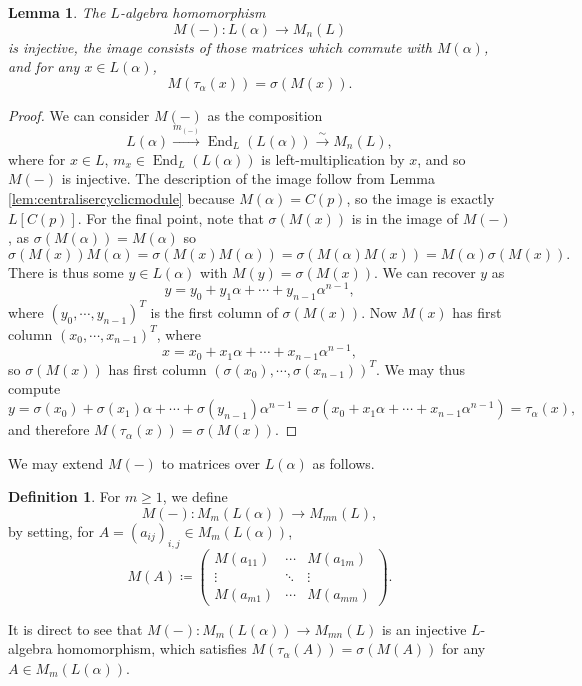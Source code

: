 \documentclass[10pt, reqno, hidelinks]{amsart}
\DeclareMathOperator{\End}{End}
\numberwithin{thm}{subsection}
\newtheorem{lemma}[thm]{Lemma}
\theoremstyle{definition}
\newtheorem{defn}[thm]{Definition}
\begin{document}
\begin{lemma}\label{lem:imageoffield1dim}
   The $L$-algebra homomorphism 
   \[
   M(-): L(\alpha) \rightarrow M_n(L)
   \]
   is injective, the image consists of those matrices which commute with $M(\alpha)$, and for any $x \in L(\alpha)$,
   \[
   M(\tau_{\alpha}(x)) = \sigma(M(x)).
   \]
\end{lemma}

\begin{proof}
   We can consider $M(-)$ as the composition
   \[
   L(\alpha) \xrightarrow{m_{(-)}} \End_L(L(\alpha)) \xrightarrow{\sim} M_n(L),
   \]
   where for $x \in L$, $m_x \in \End_L(L(\alpha))$ is left-multiplication by $x$, and so $M(-)$ is injective. The description of the image follow from Lemma \ref{lem:centralisercyclicmodule} because $M(\alpha) = C(p)$, so the image is exactly $L[C(p)]$. For the final point, note that $\sigma(M(x))$ is in the image of $M(-)$, as $\sigma(M(\alpha)) = M(\alpha)$ so
\[
\sigma(M(x)) M(\alpha) = \sigma(M(x)M(\alpha)) = \sigma(M(\alpha)M(x)) = M(\alpha) \sigma(M(x)).
\]
There is thus some $y \in L(\alpha)$ with $M(y) = \sigma(M(x))$. We can recover $y$ as
\[
y = y_0 + y_1 \alpha + \cdots + y_{n-1}\alpha^{n-1},
\]
where $(y_0, \cdots, y_{n-1})^T$ is the first column of $\sigma(M(x))$. Now $M(x)$ has first column $(x_0, \cdots, x_{n-1})^T$, where
\[
x = x_0 + x_1\alpha + \cdots + x_{n-1}\alpha^{n-1},
\]
so $\sigma(M(x))$ has first column $(\sigma(x_0), \cdots, \sigma(x_{n-1}))^T$. We may thus compute
\[
y = \sigma(x_0) + \sigma(x_1) \alpha + \cdots + \sigma(y_{n-1})\alpha^{n-1} = \sigma(x_0 + x_1\alpha + \cdots + x_{n-1}\alpha^{n-1}) = \tau_{\alpha}(x),
\]
and therefore $M(\tau_{\alpha}(x)) = \sigma(M(x))$.
\end{proof}

We may extend $M(-)$ to matrices over $L(\alpha)$ as follows.

\begin{defn}
   For $m \geq 1$, we define
   \[
   M(-) \colon M_m(L(\alpha)) \rightarrow M_{mn}(L),
   \]
   by setting, for $A = (a_{ij})_{i,j} \in M_m(L(\alpha))$,
   \[
       M(A) \coloneqq \begin{pmatrix}
   M(a_{11}) & \cdots & M(a_{1m}) \\
   \vdots & \ddots & \vdots \\
   M(a_{m1})  & \cdots & M(a_{mm})
\end{pmatrix}.
   \]
\end{defn}

It is direct to see that $M(-) \colon M_m(L(\alpha)) \rightarrow M_{mn}(L)$ is an injective $L$-algebra homomorphism, which satisfies $M(\tau_{\alpha}(A)) = \sigma(M(A))$ for any $A \in M_m(L(\alpha))$.
\end{document}
